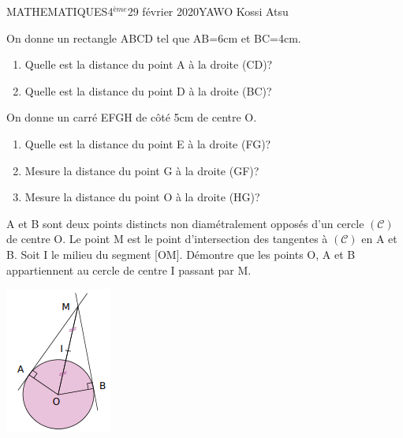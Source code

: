\documentclass[12pt,a4paper]{book}
\newcommand{\prof}{YAWO Kossi Atsu}
\newcommand{\matiere}{MATHEMATIQUES}
\newcommand{\classe}{4$^{ème}$}
\begin{document}
\begin{td}{\matiere}{\classe}{29 février 2020}{\prof}
\vspace{0.5cm}


\begin{exo}
On donne un rectangle ABCD tel que AB=6cm et BC=4cm.
\begin{enumerate}
\item Quelle est la distance du point A à la droite (CD)?
\item Quelle est la distance du point D à la droite (BC)?
\end{enumerate}
\end{exo}

\vspace{0.5cm}


\begin{exo}
On donne un carré EFGH de côté 5cm de centre O.
\begin{enumerate}
\item Quelle est la distance du point E à la droite (FG)?
\item Mesure la distance du point G à la droite (GF)?
\item Mesure la distance du point O à la droite (HG)?
\end{enumerate}
\end{exo}

\begin{exo}
\begin{multicols}{2}
A et B sont deux points
distincts non diamétralement
opposés d'un cercle $\mathcal{(C)}$ de
centre O. Le point M est le
point d'intersection des
tangentes à $\mathcal{(C)}$ en A et B.
Soit I le milieu du segment
[OM]. Démontre que les
points O, A et B
appartiennent au cercle de
centre I passant par M.\\
\begin{center}
\includegraphics[scale=0.8]{images/td_29_02_2020_img1.png}
\end{center}
\end{multicols}

\end{exo}
\end{td}
\end{document}
